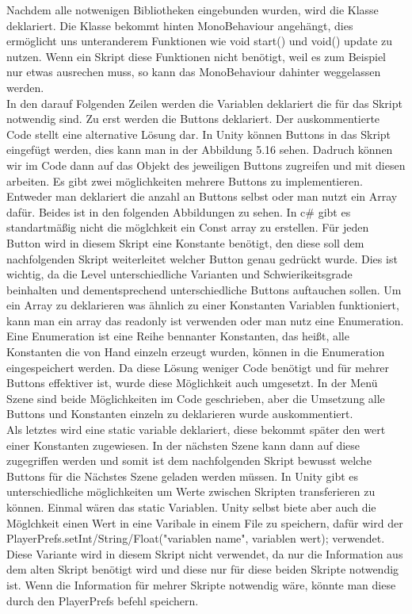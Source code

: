 Nachdem alle notwenigen Bibliotheken eingebunden wurden, wird die Klasse deklariert. Die Klasse bekommt hinten MonoBehaviour angehängt, dies ermöglicht uns unteranderem Funktionen wie void start() und void() update zu nutzen. Wenn ein Skript diese Funktionen nicht benötigt, weil es zum Beispiel nur etwas ausrechen muss, so kann das MonoBehaviour dahinter weggelassen werden.\\
In den darauf Folgenden Zeilen werden die Variablen deklariert die für das Skript notwendig sind. Zu erst werden die Buttons deklariert. Der auskommentierte Code stellt eine alternative Lösung dar. In Unity können Buttons in das Skript eingefügt werden, dies kann man in der Abbildung 5.16 sehen. Dadruch können wir im Code dann auf das Objekt des jeweiligen Buttons zugreifen und mit diesen arbeiten. Es gibt zwei möglichkeiten mehrere Buttons zu implementieren. Entweder man deklariert die anzahl an Buttons selbst oder man nutzt ein Array dafür. Beides ist in den folgenden Abbildungen zu sehen.
In c# gibt es standartmäßig nicht die möglchkeit ein Const array zu erstellen. Für jeden Button wird in diesem Skript eine Konstante benötigt, den diese soll dem nachfolgenden Skript weiterleitet welcher Button genau gedrückt wurde. Dies ist wichtig, da die Level unterschiedliche Varianten und Schwierikeitsgrade beinhalten und dementsprechend unterschiedliche Buttons auftauchen sollen. Um ein Array zu deklarieren was ähnlich zu einer Konstanten Variablen funktioniert, kann man ein array das readonly ist verwenden oder man nutz eine Enumeration. Eine Enumeration ist eine Reihe bennanter Konstanten, das heißt, alle Konstanten die von Hand einzeln erzeugt wurden, können in die Enumeration eingespeichert werden. Da diese Lösung weniger Code benötigt und für mehrer Buttons effektiver ist, wurde diese Möglichkeit auch umgesetzt. In der Menü Szene sind beide Möglichkeiten im Code geschrieben, aber die Umsetzung alle Buttons und Konstanten einzeln zu deklarieren wurde auskommentiert.\\
Als letztes wird eine static variable deklariert, diese bekommt später den wert einer Konstanten zugewiesen. In der nächsten Szene kann dann auf diese zugegriffen werden und somit ist dem nachfolgenden Skript bewusst welche Buttons für die Nächstes Szene geladen werden müssen. In Unity gibt es unterschiedliche möglichkeiten um Werte zwischen Skripten transferieren zu können. Einmal wären das static Variablen. Unity selbst biete aber auch die Möglchkeit einen Wert in eine Varibale in einem File zu speichern, dafür wird der PlayerPrefs.setInt/String/Float("variablen name", variablen wert); verwendet. Diese Variante wird in diesem Skript nicht verwendet, da nur die Information aus dem alten Skript benötigt wird und diese nur für diese beiden Skripte notwendig ist. Wenn die Information für mehrer Skripte notwendig wäre, könnte man diese durch den PlayerPrefs befehl speichern.\\

